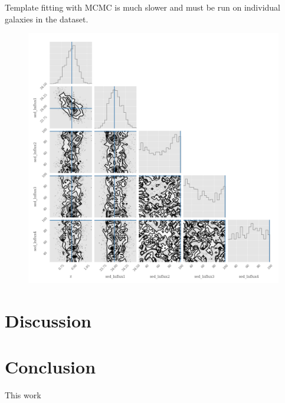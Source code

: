 \documentclass[12pt, preprint]{aastex}
\begin{document}
Template fitting with MCMC is much slower and must be run on individual galaxies in the dataset.  
\begin{figure}
\includegraphics[width=1.\textwidth]{../fig/sed_model_galsim_corner.png}
\caption{}
\label{fig:temp}
\end{figure}

\section{Discussion}

\section{Conclusion}

This work
\end{document}
